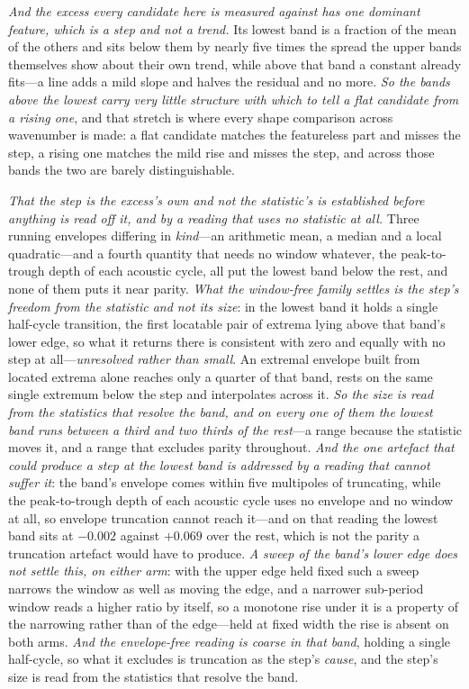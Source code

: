\documentclass[11pt,a4paper]{article}
\theoremstyle{plain}
\theoremstyle{definition}
\theoremstyle{remark}
\begin{document}
\emph{And the excess every candidate here is measured against has one dominant feature, which is a step and
not a trend.} Its lowest band is a fraction of the mean of the others and sits below them by nearly five times
the spread the upper bands themselves show about their own trend, while above that band a constant already
fits---a line adds a mild slope and halves the residual and no more. \emph{So the bands above the lowest carry very little structure with which to tell a flat candidate from
a rising one}, and that stretch is where every shape comparison across wavenumber is made: a flat candidate
matches the featureless part and misses the step, a rising one matches the mild rise and misses the step, and
across those bands the two are barely distinguishable.

\emph{That the step is the excess's own and not the statistic's is established before anything is read off
it, and by a reading that uses no statistic at all.} Three running envelopes differing in \emph{kind}---an
arithmetic mean, a median and a local quadratic---and a fourth quantity that needs no window whatever, the
peak-to-trough depth of each acoustic cycle, all put the lowest band below the rest, and none of them puts it
near parity. \emph{What the window-free family settles is the step's freedom from the statistic and not its
size}: in the lowest band it holds a single half-cycle transition, the first locatable pair of extrema lying
above that band's lower edge, so what it returns there is consistent with zero and equally with no step at
all---\emph{unresolved rather than small}. An extremal envelope built from located extrema alone reaches
only a quarter of that band, rests on the same single extremum below the step and interpolates across it.
\emph{So the size is read from the statistics that resolve the band, and on every one of them the lowest
band runs between a third and two thirds of the rest}---a range because the statistic moves it, and a range
that excludes parity throughout. \emph{And the
one artefact that could produce a step at the lowest band is addressed by a reading that cannot suffer it}: the
band's envelope comes within five multipoles of truncating, while the peak-to-trough depth of each acoustic
cycle uses no envelope and no window at all, so envelope truncation cannot reach it---and on that reading the
lowest band sits at $-0.002$ against $+0.069$ over the rest, which is not the parity a truncation artefact
would have to produce. \emph{A sweep of the band's lower edge does not settle this, on either arm}: with the
upper edge held fixed such a sweep narrows the window as well as moving the edge, and a narrower sub-period
window reads a higher ratio by itself, so a monotone rise under it is a property of the narrowing rather than
of the edge---held at fixed width the rise is absent on both arms. \emph{And the envelope-free reading is
coarse in that band}, holding a single half-cycle, so what it excludes is truncation as the step's
\emph{cause}, and the step's size is read from the statistics that resolve the band.
\end{document}
